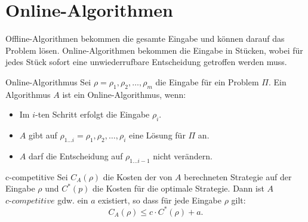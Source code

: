 \documentclass{panikzettel}
\begin{document}
\newpage
\section{Online-Algorithmen}
Offline-Algorithmen bekommen die gesamte Eingabe und können darauf das Problem lösen. Online-Algorithmen bekommen die Eingabe in Stücken, wobei für jedes Stück sofort eine unwiederrufbare Entscheidung getroffen werden muss.

\begin{halfboxl}
\vspace{-\baselineskip}
    \begin{defi}{Online-Algorithmus}
        Sei $\rho=\rho_1,\rho_2, \dots,\rho_m$ die Eingabe für ein Problem $\Pi$.
        Ein Algorithmus $A$ ist ein Online-Algorithmus, wenn:
        \begin{itemize}[nosep]
            \item Im $i$-ten Schritt erfolgt die Eingabe $\rho_i$.
            \item $A$ gibt auf $\rho_{1 \dots i} = \rho_1, \rho_2, \dots, \rho_i$ eine Lösung für $\Pi$ an.
            \item $A$ darf die Entscheidung auf $\rho_{1 \dots i-1}$ nicht verändern.
        \end{itemize}
    \end{defi}
\end{halfboxl}%
\begin{halfboxr}
\vspace{-\baselineskip}
    \begin{defi}{c-competitive}
        Sei $C_A(\rho)$ die Kosten der von $A$ berechneten Strategie auf der Eingabe $\rho$ und $C^*(p)$ die Kosten für die optimale Strategie. Dann ist $A$ $\textit{c-competitive}$ gdw. ein $a$ existiert, so dass für jede Eingabe $\rho$ gilt: $$C_A(\rho) \leq c \cdot C^*(\rho)+a.$$
    \end{defi}
\end{halfboxr}
\end{document}
